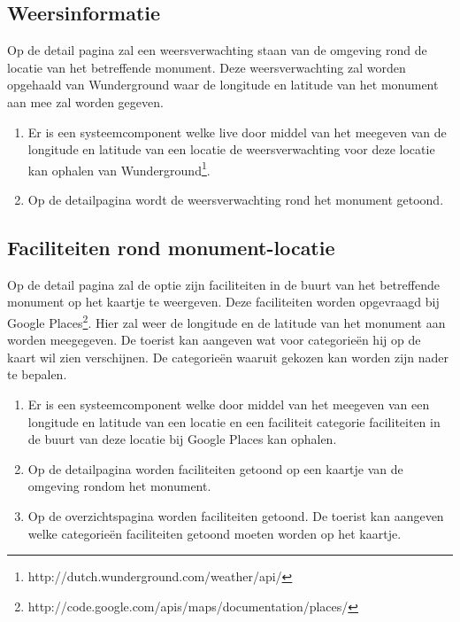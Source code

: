 \documentclass[a4paper,10pt]{article}
\begin{document}
            \subsection{Weersinformatie}
            Op de detail pagina zal een weersverwachting staan van de omgeving rond de locatie van het betreffende monument. Deze weersverwachting zal worden opgehaald van Wunderground waar de longitude en latitude van het monument aan mee zal worden gegeven.
            \begin{enumerate}
            \item Er is een systeemcomponent welke live door middel van het meegeven van de longitude en latitude van een locatie de weersverwachting voor deze locatie kan ophalen van Wunderground\footnote{http://dutch.wunderground.com/weather/api/}.
            \item Op de detailpagina wordt de weersverwachting rond het monument getoond.
            \end{enumerate}
                
            \subsection{Faciliteiten rond monument-locatie}
            Op de detail pagina zal de optie zijn faciliteiten in de buurt van het betreffende monument op het kaartje te weergeven. Deze faciliteiten worden opgevraagd bij Google Places\footnote{http://code.google.com/apis/maps/documentation/places/}. Hier zal weer de longitude en de latitude van het monument aan worden meegegeven. De toerist kan aangeven wat voor categorie\"en hij op de kaart wil zien verschijnen. De categorie\"en waaruit gekozen kan worden zijn nader te bepalen.
            \begin{enumerate}
            \item Er is een systeemcomponent welke door middel van het meegeven van een longitude en latitude van een locatie en een faciliteit categorie faciliteiten in de buurt van deze locatie bij Google Places kan ophalen.
            \item Op de detailpagina worden faciliteiten getoond op een kaartje van de omgeving rondom het monument.
	  \item  Op de overzichtspagina worden faciliteiten getoond. De toerist kan aangeven welke categorie\"en faciliteiten getoond moeten worden op het kaartje.
            \end{enumerate}
                
\end{document}
